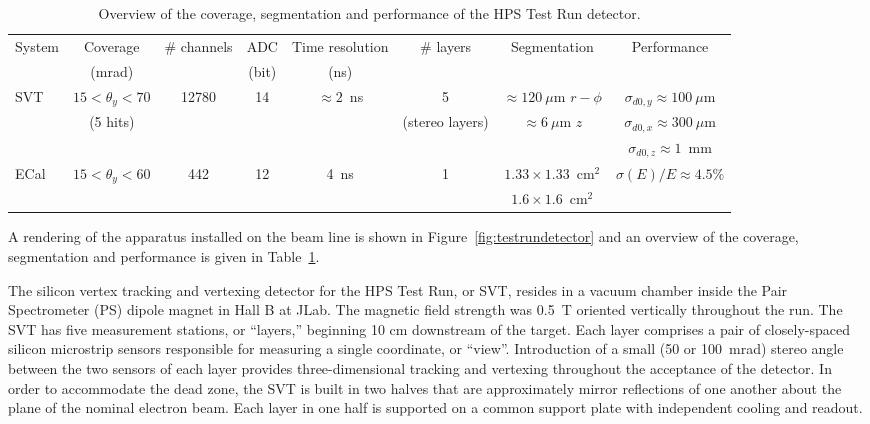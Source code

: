 \documentclass[final,3p,times,twocolumn]{elsarticle}
\begin{document}
\begin{center}
\begin{table}[t]
{\small
\caption{Overview of the coverage, segmentation and performance of the HPS Test Run detector. }
\begin{tabular}{lccccccc}
\hline 
System & Coverage & \# channels & ADC & Time resolution & \# layers & Segmentation & Performance \\
 & (mrad) &  & (bit) & (ns) &  &  &  \\
\hline
SVT & $15<\theta_{y} < 70$ & 12780 & 14 & $\approx 2$~ns & 5  & $\approx 120~\mu$m $r-\phi$ & $\sigma_{d0,y}  \approx 100~\mu$m \\
& (5 hits) &  &  &  & (stereo layers) & $\approx 6~\mu$m $z$ & $\sigma_{d0,x} \approx 300~\mu$m \\
& &  &  &  &  &  & $\sigma_{d0,z}\approx 1$~mm \\
\hline
ECal & $15<\theta_{y} < 60$ & 442 & 12 & 4~ns & 1 & $1.33\times1.33$~cm$^2$  & $\sigma(E)/E \approx 4.5\%$ \\ 
 &  &  &  &  &  & $1.6\times1.6$~cm$^2$  &  \\ 
\hline
\end{tabular}
\label{tab:detector-overview}
}
\end{table}
\end{center}
A rendering of the apparatus installed on the beam line is shown in 
Figure~\ref{fig:testrundetector} and an overview of the coverage, segmentation and performance is 
given in Table~\ref{tab:detector-overview}.  

The silicon vertex tracking and vertexing detector for the HPS Test Run, or SVT, resides in a vacuum 
chamber inside the Pair Spectrometer (PS) dipole magnet in Hall B at JLab. The magnetic field 
strength was 0.5~T oriented vertically throughout the run. The SVT has five 
measurement stations, or ``layers,'' beginning 10 cm downstream of the target. Each layer 
comprises a pair of closely-spaced silicon microstrip sensors responsible for measuring a single 
coordinate, or ``view''. Introduction of a small (50 or 100~mrad) stereo angle between the two 
sensors of each layer provides three-dimensional tracking and vertexing throughout the acceptance 
of the detector. In order to accommodate the dead zone, the 
SVT is built in two halves that are approximately mirror reflections of one another about the plane of the 
nominal electron beam.  Each layer in one half is supported on a common support plate with 
independent cooling and readout. 
\end{document}

